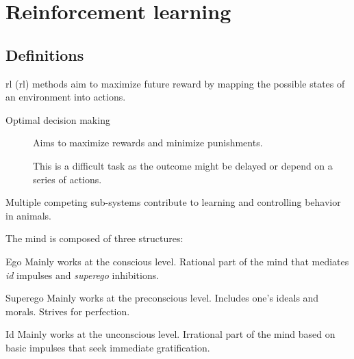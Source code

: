 \chapter{Reinforcement learning}


\section{Definitions}

\Acl{rl} (\acs{rl}) methods aim to maximize future reward by mapping the possible states of an environment into actions.

\begin{description}
    \item[Optimal decision making] 
        Aims to maximize rewards and minimize punishments.

        \begin{remark}
            This is a difficult task as the outcome might be delayed or depend on a series of actions.
            
        \end{remark}
\end{description}

\begin{remark}
    Multiple competing sub-systems contribute to learning and controlling behavior in animals.

    \begin{example}
        The mind is composed of three structures:
        \begin{descriptionlist}
            \item[Ego]
                Mainly works at the conscious level.
                Rational part of the mind that mediates \textit{id} impulses and \textit{superego} inhibitions.

            \item[Superego] 
                Mainly works at the preconscious level.
                Includes one's ideals and morals. Strives for perfection.

            \item[Id] 
                Mainly works at the unconscious level.
                Irrational part of the mind based on basic impulses that seek immediate gratification.
        \end{descriptionlist}
    \end{example}
\end{remark}


